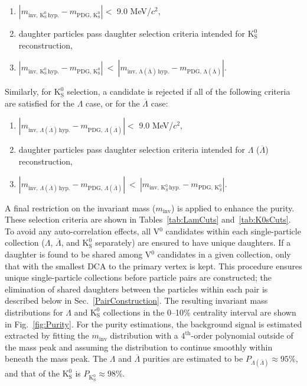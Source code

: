 \documentclass[ALICE,manyauthors]{cernphprep}
\newcommand{\minv}{$m_{\mathrm{inv}}$\xspace}
\newcommand{\Lam}{$\Lambda$\xspace}
\newcommand{\ALam}{$\overline{\Lambda}$\xspace}
\newcommand{\LamALam}{$\Lambda$ ($\overline{\Lambda}$)\xspace}
\newcommand{\Ks}{$\mathrm{K^{0}_{S}}$\xspace}
\newcommand{\Vz}{V$^{0}$\xspace}
\begin{document}
\begin{enumerate}
 \item $\left|m_{\mathrm{inv,\,K^{0}_{S}\,hyp.}} - m_{\mathrm{PDG,\,K^{0}_{S}}}\right| < $ 9.0 MeV/$c^{2}$,
 \item daughter particles pass daughter selection criteria intended for \Ks reconstruction,
 \item $\left|m_{\mathrm{inv,\,K^{0}_{S}\,hyp.}} - m_{\mathrm{PDG,\,K^{0}_{S}}}\right|~ < ~\left|m_{\mathrm{inv,\,\Lambda(\overline{\Lambda})\,hyp.}} - m_{\mathrm{PDG,\,\Lambda(\overline{\Lambda})}}\right|$.
\end{enumerate} 
Similarly, for \Ks selection, a candidate is rejected if all of the following criteria are satisfied for the \Lam case, or for the \ALam case:
\begin{enumerate}
 \item $\left|m_{\mathrm{inv},\,\Lambda(\overline{\Lambda})\,\mathrm{hyp.}} - m_{\mathrm{PDG},\,\Lambda(\overline{\Lambda})}\right| < $ 9.0 MeV/$c^{2}$,
 \item daughter particles pass daughter selection criteria intended for \LamALam reconstruction,
 \item $\left|m_{\mathrm{inv},\,\Lambda(\overline{\Lambda})\,\mathrm{hyp.}} - m_{\mathrm{PDG},\,\Lambda(\overline{\Lambda})}\right|~ < ~\left|m_{\mathrm{inv},\,\mathrm{K}^{0}_{S}\,\mathrm{hyp.}} - m_{\mathrm{PDG},\,\mathrm{K}^{0}_{S}}\right|$.
\end{enumerate} 

A final restriction on the invariant mass (\minv) is applied to enhance the purity.
These selection criteria are shown in Tables~\ref{tab:LamCuts} and~\ref{tab:K0sCuts}.
To avoid any auto-correlation effects, all \Vz candidates within each single-particle collection (\Lam, \ALam, and \Ks separately) are ensured to have unique daughters. 
If a daughter is found to be shared among \Vz candidates in a given collection, only that with the smallest DCA to the primary vertex is kept.
This procedure ensures unique single-particle collections before particle pairs are constructed; the elimination of shared daughters between the particles within each pair is described below in Sec.~\ref{PairConstruction}.
The resulting invariant mass distributions for \Lam and \Ks collections in the 0--10\% centrality interval are shown in Fig.~\ref{fig:Purity}.
For the purity estimations, the background signal is {\color{red}estimated} {\color{blue}extracted} by fitting the \minv distribution {\color{blue}with a $4^{\mathrm{th}}$-order polynomial} outside of the mass peak and assuming the distribution to continue smoothly {\color{red}within} {\color{blue}beneath} the mass peak.
The \Lam and \ALam purities are estimated to be $P_{\Lambda(\overline{\Lambda})} \approx 95\%$, and that of the \Ks is $P_{\mathrm{K^{0}_{S}}} \approx 98\%$.
\end{document}
